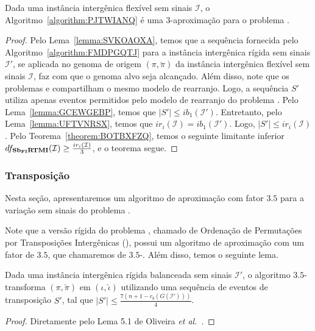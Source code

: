 \begin{theorem}\label{theorem:TYVMEDAI}
Dada uma instância intergênica flexível sem sinais $\mathcal{I}$, o Algoritmo~\ref{algorithm:PJTWIANQ} é uma $3$-aproximação para o problema \SbFIRTMI{}.
\end{theorem}
\begin{proof}
Pelo Lema~\ref{lemma:SVKOAOXA}, temos que a sequência fornecida pelo Algoritmo~\ref{algorithm:FMDPGQTJ} para a instância intergênica rígida sem sinais $\mathcal{I'}$, se aplicada no genoma de origem $(\pi,\breve\pi)$ da instância intergênica flexível sem sinais $\mathcal{I}$, faz com que o genoma alvo seja alcançado. Além disso, note que os problemas \SbIRTMI{} e \SbFIRTMI{} compartilham o mesmo modelo de rearranjo. Logo, a sequência $S'$ utiliza apenas eventos permitidos pelo modelo de rearranjo do problema \SbFIRTMI{}. Pelo Lema~\ref{lemma:GCEWGEBP}, temos que $|S'| \le ib_1(\mathcal{I}')$. Entretanto, pelo Lema~\ref{lemma:UFTVNRSX}, temos que $ir_i(\mathcal{I}) = ib_1(\mathcal{I'})$. Logo, $|S'| \le ir_i(\mathcal{I})$. Pelo Teorema~\ref{theorem:BOTBXFZQ}, temos o seguinte limitante inferior $df_{\textbf{Sb\textsubscript{FI}RTMI}}(\mathcal{I}) \ge \frac{ir_i(\mathcal{I})}{3}$, e o teorema segue.
\end{proof}

\subsubsection{Transposição}

Nesta seção, apresentaremos um algoritmo de aproximação com fator $3.5$ para a variação sem sinais do problema \SbFIT{}. 

Note que a versão rígida do problema \SbFIT{}, chamado de Ordenação de Permutações por Transposições Intergênicas (\SbIT), possui um algoritmo de aproximação com um fator de $3.5$, que chamaremos de $3.5$-\SbIT{}. Além disso, temos o seguinte lema.

\begin{lemma}\label{lemma:EIGSYNDP}
Dada uma instância intergênica rígida balanceada sem sinais $\mathcal{I}'$, o algoritmo $3.5$-\SbIT{} transforma $(\pi,\breve\pi)$ em $(\iota,\breve\iota)$ utilizando uma sequência de eventos de transposição $S'$, tal que $|S'| \le \frac{7({n+1} - c_b(G(\mathcal{I}')))}{4}$.
\end{lemma}
\begin{proof}
Diretamente pelo Lema 5.1 de Oliveira \textit{et al.}~\cite{2021a-oliveira-etal}.
\end{proof}

